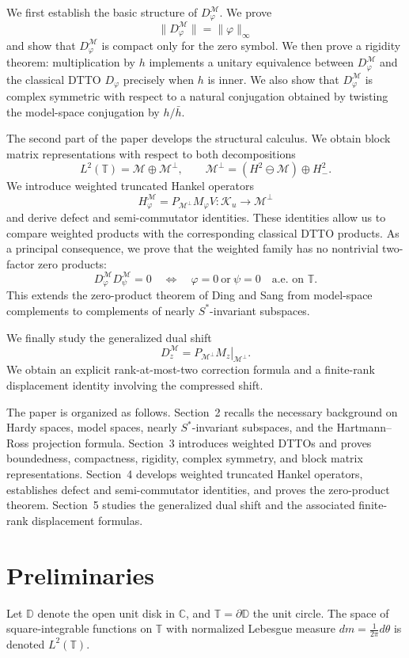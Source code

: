 \documentclass[12pt]{amsart}
\theoremstyle{definition}
\theoremstyle{remark}
\def \D{\mathbb{D}}
\def \C{\mathbb{C}}
\def \T{\mathbb{T}}
\newcommand{\clm}{\mathcal{M}}
\newcommand{\clk}{\mathcal{K}}
\newcommand{\vp}{\varphi}
\newcommand\restr[2]{\ensuremath{\left.#1\right|_{#2}}}
\numberwithin{equation}{section}
\begin{document}
We first establish the basic structure of $D_\vp^\clm$. We prove
\[
\|D_\vp^\clm\|=\|\vp\|_\infty
\]
and show that $D_\vp^\clm$ is compact only for the zero symbol. We then prove a rigidity theorem: multiplication by $h$ implements a unitary equivalence between $D_\vp^\clm$ and the classical DTTO $D_\vp$ precisely when $h$ is inner. We also show that $D_\vp^\clm$ is complex symmetric with
respect to a natural conjugation obtained by twisting the model-space conjugation by $h/\bar h$.

The second part of the paper develops the structural calculus. We obtain block matrix representations with respect to both decompositions
\[
L^2(\T)=\clm\oplus\clm^\perp,
\qquad
\clm^\perp=(H^2\ominus\clm)\oplus H^2_-.
\]
We introduce weighted truncated Hankel operators
\[
H_\vp^\clm
=
P_{\clm^\perp}M_\vp V:
\clk_u\to\clm^\perp
\]
and derive defect and semi-commutator identities. These identities allow us to compare weighted products with the corresponding classical DTTO products. As a principal consequence, we prove that the weighted family has no nontrivial two-factor zero products:
\[
D_\vp^\clm D_\psi^\clm=0
\quad\Longleftrightarrow\quad
\vp=0\ \text{or}\ \psi=0
\quad\text{a.e. on }\T.
\]
This extends the zero-product theorem of Ding and Sang from model-space complements to complements of nearly $S^*$-invariant subspaces.

We finally study the generalized dual shift
\[
D_z^\clm
=
\restr{P_{\clm^\perp}M_z}{\clm^\perp}.
\]
We obtain an explicit rank-at-most-two correction formula and a finite-rank displacement identity involving the compressed shift.

The paper is organized as follows. Section~2 recalls the necessary background on Hardy spaces, model spaces, nearly $S^*$-invariant subspaces, and the Hartmann--Ross projection formula. Section~3 introduces weighted DTTOs and proves boundedness, compactness, rigidity, complex symmetry, and block matrix representations. Section~4 develops weighted truncated Hankel operators, establishes defect and semi-commutator identities, and proves the zero-product theorem. Section~5 studies the generalized dual shift and the associated finite-rank displacement formulas.

\section{Preliminaries}

Let $\D$ denote the open unit disk in $\C$, and $\T = \partial \D$ the unit circle. The space of square-integrable functions on $\T$ with normalized Lebesgue measure $dm = \frac{1}{2\pi} d\theta$ is denoted $L^2(\T)$. 
\end{document}
